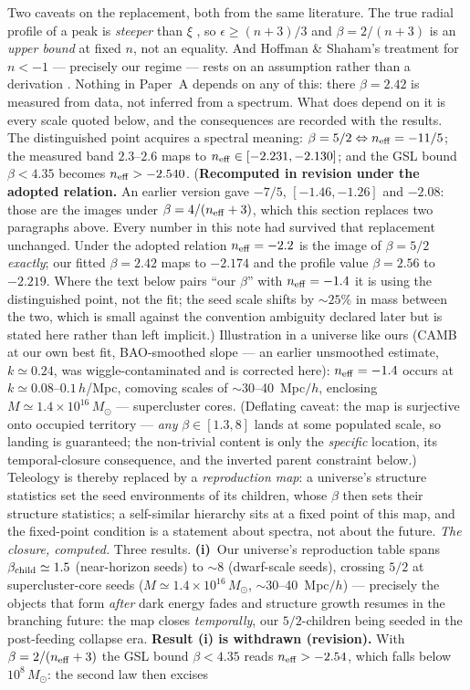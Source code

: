 \documentclass[11pt]{article}
\begin{document}
Two caveats on the replacement, both from the same literature. The true radial profile of a peak
is \emph{steeper} than $\xi$ \cite{Diemand2004}, so $\epsilon \geq (n+3)/3$ and
$\beta = 2/(n+3)$ is an \emph{upper bound} at fixed $n$, not an equality. And Hoffman \& Shaham's
treatment for $n < -1$ --- precisely our regime --- rests on an assumption rather than a derivation
\cite{DelPopolo2009}. Nothing in Paper~A depends on any of this: there $\beta = 2.42$ is measured
from data, not inferred from a spectrum. What does depend on it is every scale quoted below, and
the consequences are recorded with the results. The distinguished point acquires a spectral meaning: $\beta = 5/2 \Leftrightarrow n_{\rm eff} = -11/5$; the measured band $2.3$--$2.6$ maps to $n_{\rm eff} \in [-2.231, -2.130]$; and the GSL bound $\beta < 4.35$ becomes $n_{\rm eff} > -2.540$. (\textbf{Recomputed in revision under the adopted relation.} An earlier version gave $-7/5$, $[-1.46, -1.26]$ and $-2.08$: those are the images under $\beta = 4/(n_{\rm eff}+3)$, which this section replaces two paragraphs above. Every number in this note had survived that replacement unchanged. Under the adopted relation $n_{\rm eff} = -2.2$ is the image of $\beta = 5/2$ \emph{exactly}; our fitted $\beta = 2.42$ maps to $-2.174$ and the profile value $\beta = 2.56$ to $-2.219$. Where the text below pairs ``our $\beta$'' with $n_{\rm eff} = -1.4$ it is using the distinguished point, not the fit; the seed scale shifts by $\sim 25\%$ in mass between the two, which is small against the convention ambiguity declared later but is stated here rather than left implicit.) Illustration in a universe like ours (CAMB at our own best fit, BAO-smoothed slope --- an earlier unsmoothed estimate, $k \simeq 0.24$, was wiggle-contaminated and is corrected here): $n_{\rm eff} = -1.4$ occurs at $k \simeq 0.08$--$0.1\,h$/Mpc, comoving scales of $\sim$30--40~Mpc$/h$, enclosing $M \simeq 1.4\times10^{16}\,M_\odot$ --- supercluster cores. (Deflating caveat: the map is surjective onto occupied territory --- \emph{any} $\beta \in [1.3, 8]$ lands at some populated scale, so landing is guaranteed; the non-trivial content is only the \emph{specific} location, its temporal-closure consequence, and the inverted parent constraint below.) Teleology is thereby replaced by a \emph{reproduction map}: a universe's structure statistics set the seed environments of its children, whose $\beta$ then sets their structure statistics; a self-similar hierarchy sits at a fixed point of this map, and the fixed-point condition is a statement about spectra, not about the future. \emph{The closure, computed.} Three results. \textbf{(i)}~Our universe's reproduction table spans $\beta_{\rm child} \simeq 1.5$ (near-horizon seeds) to $\sim 8$ (dwarf-scale seeds), crossing $5/2$ at supercluster-core seeds ($M \simeq 1.4\times10^{16}\,M_\odot$, $\sim$30--40~Mpc$/h$) --- precisely the objects that form \emph{after} dark energy fades and structure growth resumes in the branching future: the map closes \emph{temporally}, our $5/2$-children being seeded in the post-feeding collapse era. \textbf{Result (i) is withdrawn (revision).} With $\beta = 2/(n_{\rm eff}+3)$ the GSL bound $\beta < 4.35$ reads $n_{\rm eff} > -2.54$, which falls below $10^{8}\,M_\odot$: the second law then excises 
\end{document}
